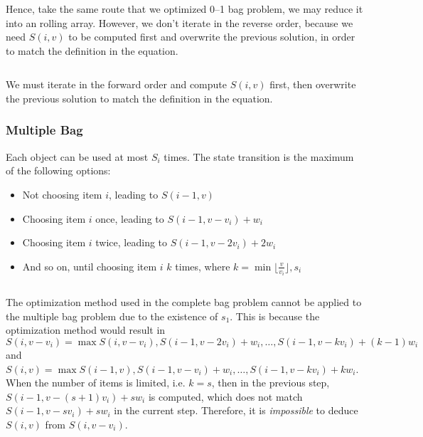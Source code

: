 \documentclass{article}
\begin{document}
Hence, take the same route that we optimized 0--1 bag problem, we may reduce it into an rolling array. However, we don't iterate in the reverse order, because we need $S(i, v)$ to be computed first and overwrite the previous solution, in order to match the definition in the equation.

\begin{center}
	\inputminted[firstline=13, lastline=18]{cpp}{src/final-complete-bag.cpp}
\end{center}

We must iterate in the forward order and compute $S(i,v)$ first, then overwrite the previous solution to match the definition in the equation.

\subsubsection{Multiple Bag}

Each object can be used at most $S_i$ times. The state transition is the maximum of the following options:
\begin{itemize}
	\item Not choosing item $i$, leading to $S(i-1,v)$
	\item Choosing item $i$ once, leading to $S(i-1,v-v_i)+w_i$
	\item Choosing item $i$ twice, leading to $S(i-1,v-2v_i)+2w_i$
	\item And so on, until choosing item $i$ $k$ times, where $k=\min{\lfloor \frac{v}{v_i} \rfloor, s_i}$
\end{itemize}

\begin{center}
	\inputminted{cpp}{src/struct-rudimentary-multiple-bag.cpp}
\end{center}

The optimization method used in the complete bag problem cannot be applied to the multiple bag problem due to the existence of $s_1$. This is because the optimization method would result in $S(i, v - v_i) = \max { S(i, v - v_i), S(i - 1, v - 2 v_i) + w_i, \ldots, S(i - 1, v - k v_i) + (k - 1) w_i }$ and $S(i, v) = \max { S(i - 1, v), S(i - 1, v - v_i) + w_i, \ldots, S(i - 1, v - k v_i) + k w_i }$. When the number of items is limited, i.e. $k = s$, then in the previous step, $S(i - 1, v - (s + 1) v_i) + s w_i$ is computed, which does not match $S(i - 1, v - s v_i) + s w_i$ in the current step. Therefore, it is \emph{impossible} to deduce $S(i, v)$ from $S(i, v - v_i)$.
\end{document}
